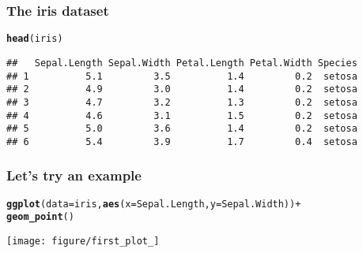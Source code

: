 \documentclass{beamer}\usepackage[]{graphicx}\usepackage[]{color}
\makeatletter
\newcommand{\hlkwd}[1]{\textcolor[rgb]{0.737,0.353,0.396}{\textbf{#1}}}%
\newenvironment{kframe}{%
 \def\at@end@of@kframe{}%
 \ifinner\ifhmode%
  \def\at@end@of@kframe{\end{minipage}}%
  \begin{minipage}{\columnwidth}%
 \fi\fi%
 \def\FrameCommand##1{\hskip\@totalleftmargin \hskip-\fboxsep
 \colorbox{shadecolor}{##1}\hskip-\fboxsep
     \hskip-\linewidth \hskip-\@totalleftmargin \hskip\columnwidth}%
 \MakeFramed {\advance\hsize-\width
   \@totalleftmargin\z@ \linewidth\hsize
   \@setminipage}}%
 {\par\unskip\endMakeFramed%
 \at@end@of@kframe}
\newenvironment{knitrout}{}{} %
\makeatother
\begin{document}
\begin{frame}[fragile]
\frametitle{The iris dataset}
\begin{knitrout}\footnotesize
{}\color{fgcolor}\begin{kframe}
\begin{alltt}
\hlkwd{head}(iris)
\end{alltt}
\begin{verbatim}
##   Sepal.Length Sepal.Width Petal.Length Petal.Width Species
## 1          5.1         3.5          1.4         0.2  setosa
## 2          4.9         3.0          1.4         0.2  setosa
## 3          4.7         3.2          1.3         0.2  setosa
## 4          4.6         3.1          1.5         0.2  setosa
## 5          5.0         3.6          1.4         0.2  setosa
## 6          5.4         3.9          1.7         0.4  setosa
\end{verbatim}
\end{kframe}
\end{knitrout}

\end{frame}

\begin{frame}[fragile]
\frametitle{Let's try an example}
\begin{knitrout}\footnotesize
{}\color{fgcolor}\begin{kframe}
\begin{alltt}
\hlkwd{ggplot}(data = iris, \hlkwd{aes}(x = Sepal.Length, y = Sepal.Width)) +
\hlkwd{geom_point}()
\end{alltt}
\end{kframe}

{\centering \texttt{[image: figure/first\_plot\_]} 

}



\end{knitrout}

\end{frame}
\end{document}
